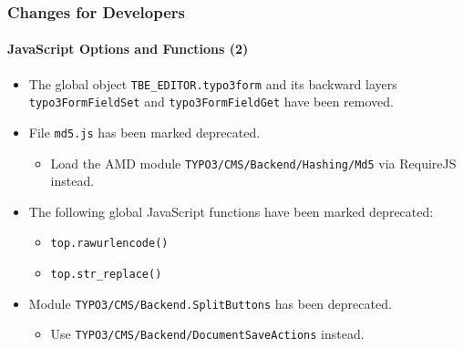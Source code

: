\begin{frame}[fragile]
	\frametitle{Changes for Developers}
	\framesubtitle{JavaScript Options and Functions (2)}

	\begin{itemize}

		\item The global object \texttt{TBE\_EDITOR.typo3form} and its backward layers \texttt{typo3FormFieldSet}
			and \texttt{typo3FormFieldGet} have been removed.

		\item File \texttt{md5.js} has been marked deprecated.

			\begin{itemize}\smaller
				\item[\ding{228}] Load the AMD module \texttt{TYPO3/CMS/Backend/Hashing/Md5} via RequireJS instead.
			\end{itemize}\normalsize

		\item The following global JavaScript functions have been marked deprecated:

		\begin{itemize}
			\item \texttt{top.rawurlencode()}
			\item \texttt{top.str\_replace()}
		\end{itemize}

		\item Module \texttt{TYPO3/CMS/Backend.SplitButtons} has been deprecated.

			\begin{itemize}\smaller
				\item[\ding{228}] Use \texttt{TYPO3/CMS/Backend/DocumentSaveActions} instead.
			\end{itemize}\normalsize

 	\end{itemize}

\end{frame}


